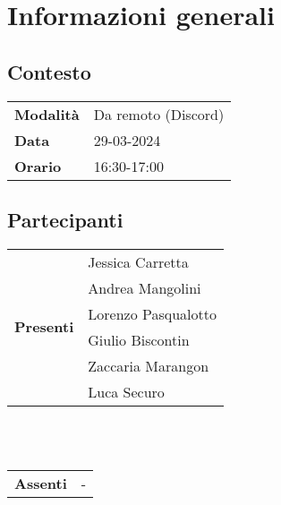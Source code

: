 \section{Informazioni generali}
    \subsection{Contesto}
        \begin{tabular}{ p{2.2cm} | l }
            \textbf{Modalità} & Da remoto (Discord)\\  %
            \textbf{Data} & 29-03-2024\\    %
            \textbf{Orario} & 16:30-17:00   %
        \end{tabular}

        \subsection{Partecipanti}

        \begin{tabular}{ p{2.2cm} | l }   %
            \multirow{6}{*}{\textbf{Presenti}} 
                & Jessica Carretta \\
                & Andrea Mangolini \\
                & Lorenzo Pasqualotto \\
                & Giulio Biscontin \\
                & Zaccaria Marangon \\
                & Luca Securo
        \end{tabular} 
        \\
        \vspace*{0.2cm}
        \\
        \begin{tabular}{ p{2.2cm} | l }   %
            \multirow{1}{*}{\textbf{Assenti}} & -
        \end{tabular} 
        \\
        \\